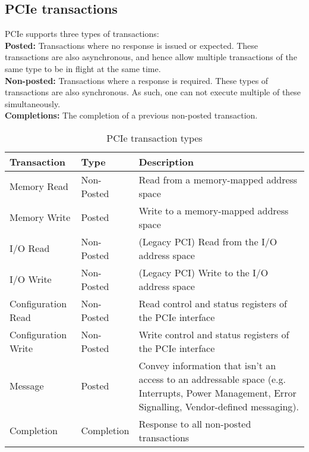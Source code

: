 \subsection{PCIe transactions}
\label{sec:pcie-transactions-background}

PCIe supports three types of transactions:\\
\textbf{Posted:} Transactions where no response is issued or expected. 
These transactions are also asynchronous, and hence allow multiple transactions of the same type to be in flight at the same time.\\
\textbf{Non-posted:} Transactions where a response is required. 
These types of transactions are also synchronous.
As such, one can not execute multiple of these simultaneously.\\
\textbf{Completions:} The completion of a previous non-posted transaction.\\


\begin{table}[h]
    \centering
    \begin{tabular}{|l|l|p{}|}
        \hline
        \textbf{Transaction} & \textbf{Type} & \textbf{Description} \\ 
        \hline
        Memory Read         & Non-Posted & Read from a memory-mapped address space \\ 
        Memory Write        & Posted     & Write to a memory-mapped address space  \\ 
        I/O Read            & Non-Posted & (Legacy PCI) Read from the I/O address space \\ 
        I/O Write           & Non-Posted & (Legacy PCI) Write to the I/O address space \\ 
        Configuration Read  & Non-Posted & Read control and status registers of the PCIe interface \\ 
        Configuration Write & Non-Posted & Write control and status registers of the PCIe interface \\  
        Message             & Posted     & Convey information that isn't an access to an addressable space (e.g. Interrupts, Power Management, Error Signalling, Vendor-defined messaging). \\
        Completion          & Completion & Response to all non-posted transactions \\ 
        \hline
    \end{tabular}
    \caption{PCIe transaction types}
    \label{tab:pcie-transaction-types}
\end{table}

